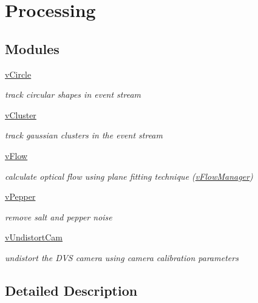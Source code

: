 \hypertarget{group__processing}{\section{Processing}
\label{group__processing}
}
\subsection*{Modules}
\begin{DoxyCompactItemize}
\item 
\hyperlink{group__vCircle}{v\-Circle}
\begin{DoxyCompactList}\small\item\em track circular shapes in event stream \end{DoxyCompactList}\item 
\hyperlink{group__vCluster}{v\-Cluster}
\begin{DoxyCompactList}\small\item\em track gaussian clusters in the event stream \end{DoxyCompactList}\item 
\hyperlink{group__vFlow}{v\-Flow}
\begin{DoxyCompactList}\small\item\em calculate optical flow using plane fitting technique (\hyperlink{classvFlowManager}{v\-Flow\-Manager}) \end{DoxyCompactList}\item 
\hyperlink{group__vPepper}{v\-Pepper}
\begin{DoxyCompactList}\small\item\em remove salt and pepper noise \end{DoxyCompactList}\item 
\hyperlink{group__vUndistortCam}{v\-Undistort\-Cam}
\begin{DoxyCompactList}\small\item\em undistort the D\-V\-S camera using camera calibration parameters \end{DoxyCompactList}\end{DoxyCompactItemize}


\subsection{Detailed Description}
